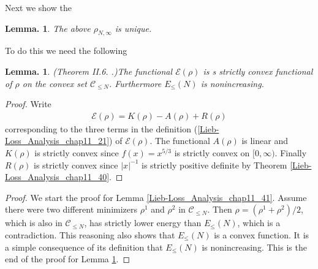 \documentclass[openany, a4paper, oneside]{book}
\theoremstyle{break}
\newtheorem{lem}[thm]{Lemma.}
\theoremstyle{breakdefn}
\newcommand{\abs}[1]{\left|#1\right|}
\newcommand{\calC}{\mathcal{C}}
\newcommand{\calE}{\mathcal{E}}
\newcommand{\EleqN}{E_{\leq}(N)}
\newcommand{\rhoNinfty}{\rho_{N, \infty}}
\begin{document}
Next we show the
\begin{lem}\label{Lieb-Loss_Analysis_chap11_38}
 The above $\rhoNinfty$ is unique.
\end{lem}
To do this we need the following
\begin{lem}\textup{(Theorem II.6. \cite{LiebSimon1}.)}\label{Lieb-Loss_Analysis_chap11_25}
 The functional $\calE (\rho)$ is s strictly convex functional of $\rho$ on the convex set $\calC_{\leq N}$.
 Furthermore $\EleqN$ is nonincreasing.
\end{lem}
\begin{proof}
Write
\begin{align}
 \calE (\rho)
 =
 K (\rho) - A (\rho) + R (\rho)
\end{align}
corresponding to the three terms in the definition (\ref{Lieb-Loss_Analysis_chap11_21}) of $\calE (\rho)$.
The functional $A (\rho)$ is linear and $K (\rho)$ is strictly convex
since $f (x) = x^{5/3}$ is strictly convex on $[0, \infty)$.
Finally $R (\rho)$ is strictly convex since $\abs{x}^{-1}$ is strictly positive definite by Theorem \ref{Lieb-Loss_Analysis_chap11_40}.
\end{proof}

\begin{proof}
We start the proof for Lemma \ref{Lieb-Loss_Analysis_chap11_41}.
Assume there were two different minimizers $\rho^1$ and $\rho^2$ in $\calC_{\leq N}$.
Then $\rho = (\rho^1 + \rho^2) / 2$, which is also in $\calC_{\leq N}$, has strictly lower energy than $\EleqN$,
which is a contradiction.
This reasoning also shows that $\EleqN$ is a convex function.
It is a simple consequence of its definition that $\EleqN$ is nonincreasing.
This is the end of the proof for Lemma \ref{Lieb-Loss_Analysis_chap11_38}.
\end{proof}
\end{document}
